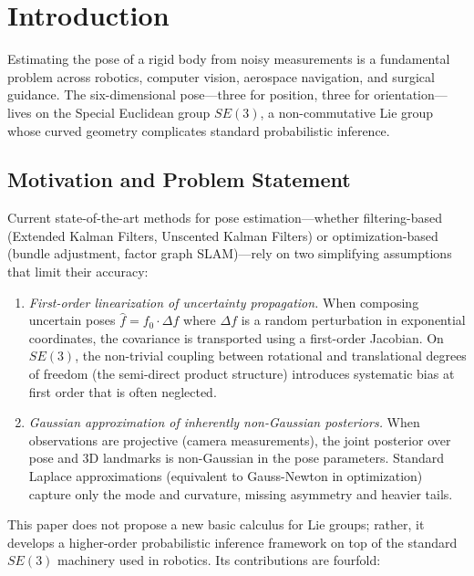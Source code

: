 \documentclass[journal]{IEEEtran}
\begin{document}
\section{Introduction}
\label{sec:intro}

Estimating the pose of a rigid body from noisy measurements is a 
fundamental problem across robotics, computer vision, aerospace 
navigation, and surgical guidance. The six-dimensional pose---three 
for position, three for orientation---lives on the Special Euclidean 
group $SE(3)$, a non-commutative Lie group whose curved geometry 
complicates standard probabilistic inference.

\subsection{Motivation and Problem Statement}

Current state-of-the-art methods for pose estimation---whether 
filtering-based (Extended Kalman Filters, Unscented Kalman Filters) 
or optimization-based (bundle adjustment, factor graph SLAM)---rely 
on two simplifying assumptions that limit their accuracy:

\begin{enumerate}
\item \emph{First-order linearization of uncertainty propagation.}
When composing uncertain poses $\hat{f} = f_0 \cdot \Delta f$ 
where $\Delta f$ is a random perturbation in exponential coordinates, 
the covariance is transported using a first-order Jacobian. 
On $SE(3)$, the non-trivial coupling between rotational and 
translational degrees of freedom (the semi-direct product structure) 
introduces systematic bias at first order that is often neglected.

\item \emph{Gaussian approximation of inherently non-Gaussian posteriors.}
When observations are projective (camera measurements), 
the joint posterior over pose and 3D landmarks is non-Gaussian 
in the pose parameters. Standard Laplace approximations 
(equivalent to Gauss-Newton in optimization) capture only the 
mode and curvature, missing asymmetry and heavier tails.
\end{enumerate}

This paper does not propose a new basic calculus for Lie groups;
rather, it develops a higher-order probabilistic inference framework
on top of the standard $SE(3)$ machinery used in robotics.
Its contributions are fourfold:
\end{document}
